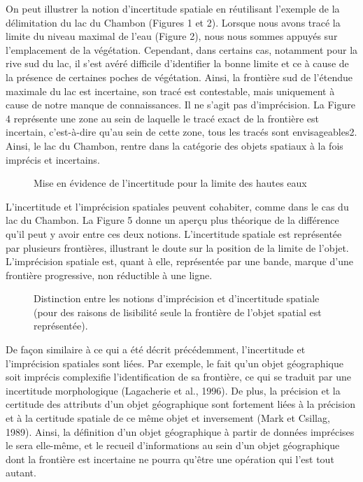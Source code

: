 On peut illustrer la notion d’incertitude spatiale en réutilisant
l’exemple de la délimitation du lac du Chambon (Figures 1 et
2). Lorsque nous avons tracé la limite du niveau maximal de l’eau
(Figure 2), nous nous sommes appuyés sur l’emplacement de la
végétation. Cependant, dans certains cas, notamment pour la rive sud
du lac, il s’est avéré difficile d’identifier la bonne limite et ce à
cause de la présence de certaines poches de végétation. Ainsi, la
frontière sud de l’étendue maximale du lac est incertaine, son tracé
est contestable, mais uniquement à cause de notre manque de
connaissances. Il ne s’agit pas d’imprécision. La Figure 4 représente
une zone au sein de laquelle le tracé exact de la frontière est
incertain, c’est-à-dire qu’au sein de cette zone, tous les tracés sont
envisageables2. Ainsi, le lac du Chambon, rentre dans la catégorie des
objets spatiaux à la fois imprécis et incertains.

\begin{figure}
  \centering
  \caption{Mise en évidence de l'incertitude pour la limite des hautes
    eaux}
  \label{fig:lim_champ_inc}
\end{figure}

L’incertitude et l’imprécision spatiales peuvent cohabiter, comme dans
le cas du lac du Chambon. La Figure 5 donne un aperçu plus théorique
de la différence qu’il peut y avoir entre ces deux
notions. L’incertitude spatiale est représentée par plusieurs
frontières, illustrant le doute sur la position de la limite de
l’objet. L’imprécision spatiale est, quant à elle, représentée par une
bande, marque d’une frontière progressive, non réductible à une ligne.

\begin{figure}
  \centering
  \caption{Distinction entre les notions d’imprécision et
    d'incertitude spatiale (pour des raisons de lisibilité seule la
    frontière de l’objet spatial est représentée).}
  \label{fig:inc_vs_imp}
\end{figure}

De façon similaire à ce qui a été décrit précédemment, l’incertitude
et l’imprécision spatiales sont liées. Par exemple, le fait qu’un
objet géographique soit imprécis complexifie l’identification de sa
frontière, ce qui se traduit par une incertitude morphologique
(Lagacherie et al., 1996). De plus, la précision et la certitude des
attributs d’un objet géographique sont fortement liées à la précision
et à la certitude spatiale de ce même objet et inversement (Mark et
Csillag, 1989). Ainsi, la définition d’un objet géographique à partir
de données imprécises le sera elle-même, et le recueil d’informations
au sein d’un objet géographique dont la frontière est incertaine ne
pourra qu’être une opération qui l’est tout autant.


